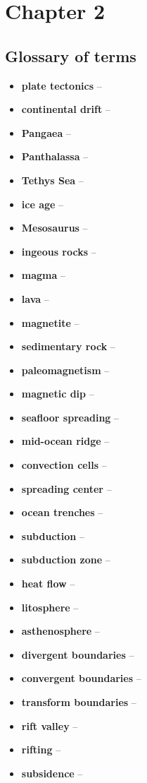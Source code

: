 \section{Chapter 2}

\subsection{Glossary of terms}
\begin{itemize}
	\item \textbf{plate tectonics} --
	\item \textbf{continental drift} --
	\item \textbf{Pangaea} --
	\item \textbf{Panthalassa} --
	\item \textbf{Tethys Sea} --
	\item \textbf{ice age} --
	\item \textbf{Mesosaurus} --
	\item \textbf{ingeous rocks} --
	\item \textbf{magma} --
	\item \textbf{lava} --
	\item \textbf{magnetite} --
	\item \textbf{sedimentary rock} --
	\item \textbf{paleomagnetism} --
	\item \textbf{magnetic dip} --
	\item \textbf{seafloor spreading} --
	\item \textbf{mid-ocean ridge} --
	\item \textbf{convection cells} --
	\item \textbf{spreading center} --
	\item \textbf{ocean trenches} --
	\item \textbf{subduction} --
	\item \textbf{subduction zone} --
	\item \textbf{heat flow} --
	\item \textbf{litosphere} --
	\item \textbf{asthenosphere} --
	\item \textbf{divergent boundaries} --
	\item \textbf{convergent boundaries} --
	\item \textbf{transform boundaries} --
	\item \textbf{rift valley} --
	\item \textbf{rifting} --
	\item \textbf{subsidence} --

\end{itemize}
